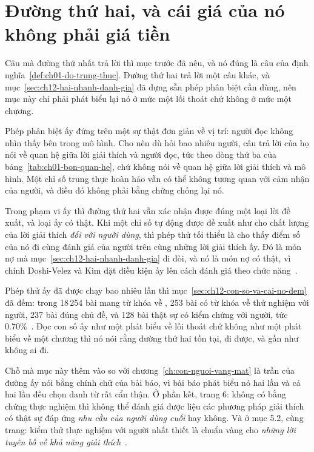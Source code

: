 \section{Đường thứ hai, và cái giá của nó không phải giá tiền}
\label{sec:ch16-duong-thu-hai}

%
Câu mà đường thứ nhất trả lời thì mục trước đã nêu, và nó đúng là câu của
định nghĩa~\ref{def:ch01-do-trung-thuc}. Đường thứ hai trả lời một câu khác, và
mục~\ref{sec:ch12-hai-nhanh-danh-gia} đã dựng sẵn phép phân biệt cần dùng, nên
mục này chỉ phải phát biểu lại nó ở mức một lối thoát chứ không ở mức một
chương.

%
Phép phân biệt ấy đứng trên một sự thật đơn giản về vị trí: người đọc không nhìn
thấy bên trong mô hình. Cho nên dù hỏi bao nhiêu người, câu trả lời của họ nói
về quan hệ giữa lời giải thích và người đọc, tức
 theo dòng thứ ba của
bảng~\ref{tab:ch01-bon-quan-he}, chứ không nói về quan hệ giữa lời giải thích và
mô hình. Một chỉ số trung thực hoàn hảo vẫn có thể không tương quan với cảm nhận
của người, và điều đó không phải bằng chứng chống lại nó.

Trong phạm vi ấy thì đường thứ hai vẫn xác nhận được đúng một loại lời đề xuất,
và loại ấy có thật. Khi một chỉ số tự động được đề xuất như
 cho chất lượng của lời giải thích
\emph{đối với người dùng}, thì phép thử tối thiểu là cho thấy điểm số của nó đi
cùng đánh giá của người trên cùng những lời giải thích ấy. Đó là món nợ mà
mục~\ref{sec:ch12-hai-nhanh-danh-gia} đi đòi, và nó là món nợ có thật, vì chính
Doshi-Velez và Kim đặt điều kiện ấy lên cách đánh giá theo chức
năng~\autocite{p14rigorous}.

%
Phép thử ấy đã được chạy bao nhiêu lần thì
mục~\ref{sec:ch12-con-so-va-cai-no-dem} đã đếm: trong 18\,254 bài mang từ khóa
về , 253 bài có từ khóa về thử nghiệm
với người, 237 bài đúng
chủ đề, và 128 bài thật sự có kiểm chứng với người, tức
0.70\%~\autocite{p24humangap}. Đọc con số ấy như một phát biểu về lối thoát chứ
không như một phát biểu về một chương thì nó nói rằng đường thứ hai tồn tại, đi
được, và gần như không ai đi.

%
Chỗ mà mục này thêm vào so với chương~\ref{ch:con-nguoi-vang-mat} là trần của
đường ấy nói bằng chính chữ của bài báo, vì bài báo phát biểu nó hai lần và cả
hai lần đều chọn danh từ rất cẩn thận. Ở phần kết, trang 6: không có bằng chứng
thực nghiệm thì không thể đánh giá được liệu các phương pháp giải thích có thật
sự đáp ứng \emph{nhu cầu của người dùng cuối} hay không. Và ở mục 5.2, cùng
trang: kiểm thử thực nghiệm với người nhất thiết là chuẩn vàng cho
\emph{những lời tuyên bố về khả năng giải thích}~\autocite{p24humangap}.


